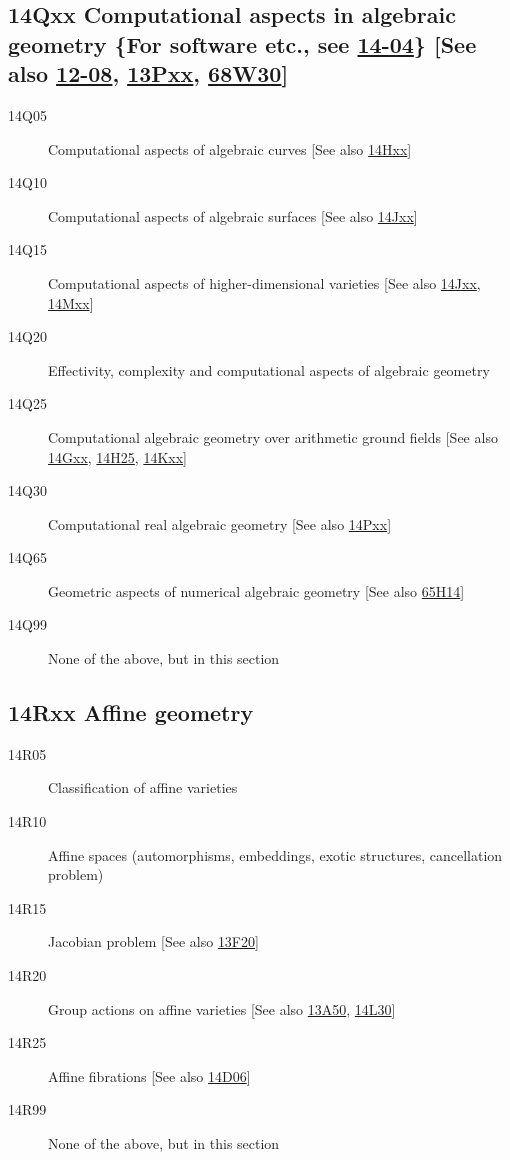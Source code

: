 \documentclass[letterpaper]{article}
\begin{document}
\subsection*{14Qxx Computational aspects in algebraic geometry \{For software etc., see \hyperref[14-04]{14-04}\} [See also \hyperref[12-08]{12-08}, \hyperref[13Pxx]{13Pxx}, \hyperref[68W30]{68W30}] }\label{14Qxx}
\begin{description}               
\item [14Q05]\label{14Q05} Computational aspects of algebraic curves [See also \hyperref[14Hxx]{14Hxx}]
\item [14Q10]\label{14Q10} Computational aspects of algebraic surfaces [See also \hyperref[14Jxx]{14Jxx}]
\item [14Q15]\label{14Q15} Computational aspects of higher-dimensional varieties [See also \hyperref[14Jxx]{14Jxx}, \hyperref[14Mxx]{14Mxx}]
\item [14Q20]\label{14Q20} Effectivity, complexity and computational aspects of algebraic geometry
\item [14Q25]\label{14Q25} Computational algebraic geometry over arithmetic ground fields [See also \hyperref[14Gxx]{14Gxx}, \hyperref[14H25]{14H25}, \hyperref[14Kxx]{14Kxx}]
\item [14Q30]\label{14Q30} Computational real algebraic geometry [See also \hyperref[14Pxx]{14Pxx}]
\item [14Q65]\label{14Q65} Geometric aspects of numerical algebraic geometry [See also \hyperref[65H14]{65H14}]
\item [14Q99]\label{14Q99} None of the above, but in this section
\end{description}          
\subsection*{14Rxx Affine geometry }\label{14Rxx}
\begin{description}               
\item [14R05]\label{14R05} Classification of affine varieties
\item [14R10]\label{14R10} Affine spaces (automorphisms, embeddings, exotic structures, cancellation problem)
\item [14R15]\label{14R15} Jacobian problem [See also \hyperref[13F20]{13F20}]
\item [14R20]\label{14R20} Group actions on affine varieties [See also \hyperref[13A50]{13A50}, \hyperref[14L30]{14L30}]
\item [14R25]\label{14R25} Affine fibrations [See also \hyperref[14D06]{14D06}]
\item [14R99]\label{14R99} None of the above, but in this section
\end{description}          
\end{document}
